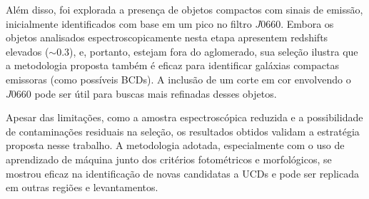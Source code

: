 Além disso, foi explorada a presença de objetos compactos com sinais de emissão, inicialmente identificados com base em um pico no filtro $J0660$. Embora os objetos analisados espectroscopicamente nesta etapa apresentem redshifts elevados ($\sim 0.3$), e, portanto, estejam fora do aglomerado, sua seleção ilustra que a metodologia proposta também é eficaz para identificar galáxias compactas emissoras (como possíveis BCDs). A inclusão de um corte em cor envolvendo o $J0660$ pode ser útil para buscas mais refinadas desses objetos.

Apesar das limitações, como a amostra espectroscópica reduzida e a possibilidade de contaminações residuais na seleção, os resultados obtidos validam a estratégia proposta nesse trabalho. A metodologia adotada, especialmente com o uso de aprendizado de máquina junto dos critérios fotométricos e morfológicos, se mostrou eficaz na identificação de novas candidatas a UCDs e pode ser replicada em outras regiões e levantamentos.